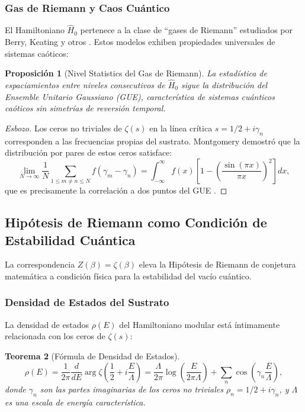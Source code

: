 \documentclass[11pt, a4paper]{article}
\theoremstyle{plain}
\newtheorem{teorema}{Teorema}[section]
\newtheorem{proposicion}[teorema]{Proposición}
\theoremstyle{definition}
\begin{document}
\subsubsection{Gas de Riemann y Caos Cuántico}

El Hamiltoniano $\hat{H}_0$ pertenece a la clase de ``gases de Riemann'' estudiados por Berry, Keating y otros \cite{Berry1999}. Estos modelos exhiben propiedades universales de sistemas caóticos:

\begin{proposicion}[Nivel Statistics del Gas de Riemann]
La estadística de espaciamientos entre niveles consecutivos de $\hat{H}_0$ sigue la distribución del Ensemble Unitario Gaussiano (GUE), característica de sistemas cuánticos caóticos sin simetrías de reversión temporal.
\end{proposicion}

\begin{proof}[Esbozo]
Los ceros no triviales de $\zeta(s)$ en la línea crítica $s = 1/2 + i\gamma_n$ corresponden a las frecuencias propias del sustrato. Montgomery demostró que la distribución por pares de estos ceros satisface:
\begin{equation}
\lim_{N \to \infty} \frac{1}{N} \sum_{1 \leq m \neq n \leq N} f(\gamma_m - \gamma_n) = \int_{-\infty}^\infty f(x) \left[1 - \left(\frac{\sin(\pi x)}{\pi x}\right)^2\right] dx,
\end{equation}
que es precisamente la correlación a dos puntos del GUE \cite{Montgomery1973}.
\end{proof}

\subsection{Hipótesis de Riemann como Condición de Estabilidad Cuántica}

La correspondencia $Z(\beta) = \zeta(\beta)$ eleva la Hipótesis de Riemann de conjetura matemática a condición física para la estabilidad del vacío cuántico.

\subsubsection{Densidad de Estados del Sustrato}

La densidad de estados $\rho(E)$ del Hamiltoniano modular está íntimamente relacionada con los ceros de $\zeta(s)$:

\begin{teorema}[Fórmula de Densidad de Estados]
\begin{equation}
\rho(E) = \frac{1}{2\pi} \frac{d}{dE} \arg \zeta\left(\frac{1}{2} + i\frac{E}{\Lambda}\right) = \frac{\Lambda}{2\pi} \log\left(\frac{E}{2\pi\Lambda}\right) + \sum_n \cos\left(\gamma_n \frac{E}{\Lambda}\right),
\label{eq:density_of_states}
\end{equation}
donde $\gamma_n$ son las partes imaginarias de los ceros no triviales $\rho_n = 1/2 + i\gamma_n$, y $\Lambda$ es una escala de energía característica.
\end{teorema}
\end{document}
